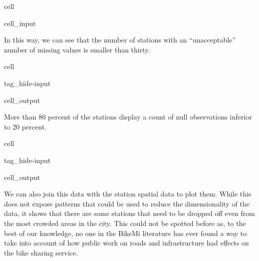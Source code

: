 \documentclass[letterpaper,10pt,english]{jupyterBook}
\begin{document}
\begin{sphinxuseclass}{cell}
\begin{sphinxuseclass}{cell_input}
\begin{sphinxVerbatim}[commandchars=\\\{\}]
  \PYG{p}{[}    \PYG{p}{]}

\PYG{p}{[}\PYG{p}{]}  
    \PYG{p}{[}\PYG{p}{]}  
\end{sphinxVerbatim}

\end{sphinxuseclass}
\end{sphinxuseclass}
\sphinxAtStartPar
In this way, we can see that the number of stations with an “unacceptable” number of missing values is smaller than thirty.

\begin{sphinxuseclass}{cell}
\begin{sphinxuseclass}{tag_hide-input}
\begin{sphinxuseclass}{cell_output}
\noindent{}

\end{sphinxuseclass}
\end{sphinxuseclass}
\end{sphinxuseclass}
\sphinxAtStartPar
More than 80 percent of the stations display a count of null observations inferior to 20 percent.

\begin{sphinxuseclass}{cell}
\begin{sphinxuseclass}{tag_hide-input}
\begin{sphinxuseclass}{cell_output}
\noindent{}

\end{sphinxuseclass}
\end{sphinxuseclass}
\end{sphinxuseclass}
\sphinxAtStartPar
We can also join this data with the station spatial data to plot them. While this does not expose patterns that could be used to reduce the dimensionality of the data, it shows that there are some stations that need to be dropped off even from the most crowded areas in the city. This could not be spotted before as, to the best of our knowledge, no one in the BikeMi literature has ever found a way to take into account of how public work on roads and infrastructure had effects on the bike sharing service.
\end{document}
